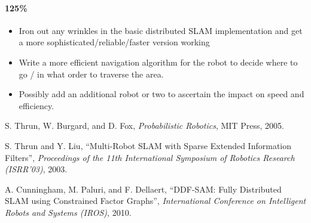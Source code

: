 \documentclass[11pt]{article}
\begin{document}
\paragraph{125\%}
\begin{itemize}
    \item Iron out any wrinkles in the basic distributed SLAM implementation and get a more sophisticated/reliable/faster version working
    \item Write a more efficient navigation algorithm for the robot to decide where to go / in what order to traverse the area.
    \item Possibly add an additional robot or two to ascertain the impact on speed and efficiency.
\end{itemize}

\begin{thebibliography}{12}
        S. Thrun, W. Burgard, and D. Fox, \emph{Probabilistic Robotics}, MIT Press, 2005.

        S. Thrun and Y. Liu, ``Multi-Robot SLAM with Sparse Extended Information Filters'', \emph{Proceedings of the 11th International Symposium of Robotics Research (ISRR'03)}, 2003.

        A. Cunningham, M. Paluri, and F. Dellaert, ``DDF-SAM: Fully Distributed SLAM using Constrained Factor Graphs'', \emph{International Conference on Intelligent Robots and Systems (IROS)}, 2010.

\end{thebibliography}
\end{document}
